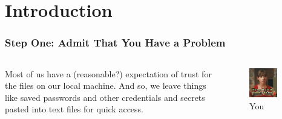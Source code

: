 \documentclass[aspectratio=169]{beamer}
\begin{document}
\section{Introduction}

\begin{frame}
    \frametitle{Step One: Admit That You Have a Problem}

    \begin{columns}

        Most of us have a (reasonable?) expectation of trust for the files on our local machine. And so, we leave things like saved passwords and other credentials and secrets pasted into text files for quick access.

        \begin{figure}
            \centering
            \includegraphics[width=0.77\textwidth]{../static/images/problem.jpg}
            \caption{You}
            \label{fig:question}
        \end{figure}

    \end{columns}


\end{frame}
\end{document}
